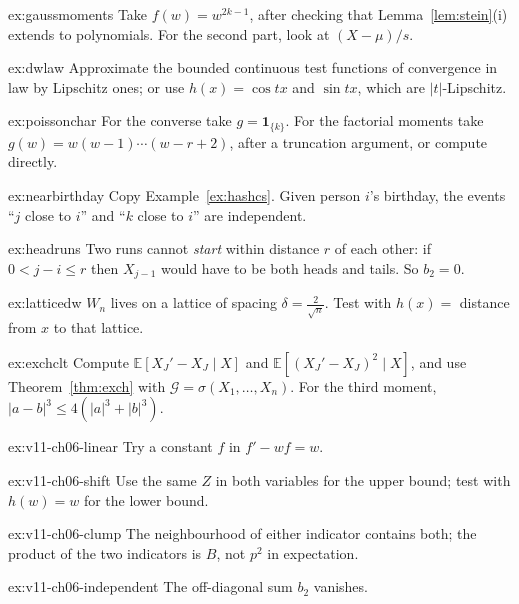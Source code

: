 \begin{hint}{ex:gaussmoments}
Take $f(w)=w^{2k-1}$, after checking that Lemma~\ref{lem:stein}(i) extends to polynomials. For the second part, look at $(X-\mu)/s$.
\end{hint}
\begin{hint}{ex:dwlaw}
Approximate the bounded continuous test functions of convergence in law by Lipschitz ones; or use $h(x)=\cos tx$ and $\sin tx$, which are $|t|$-Lipschitz.
\end{hint}
\begin{hint}{ex:poissonchar}
For the converse take $g=\mathbf 1_{\{k\}}$. For the factorial moments take $g(w)=w(w-1)\cdots(w-r+2)$, after a truncation argument, or compute directly.
\end{hint}
\begin{hint}{ex:nearbirthday}
Copy Example~\ref{ex:hashcs}. Given person $i$'s birthday, the events ``$j$ close to $i$'' and ``$k$ close to $i$'' are independent.
\end{hint}
\begin{hint}{ex:headruns}
Two runs cannot \emph{start} within distance $r$ of each other: if $0<j-i\le r$ then $X_{j-1}$ would have to be both heads and tails. So $b_2=0$.
\end{hint}
\begin{hint}{ex:latticedw}
$W_n$ lives on a lattice of spacing $\delta=\frac2{\sqrt n}$. Test with $h(x)=$ distance from $x$ to that lattice.
\end{hint}
\begin{hint}{ex:exchclt}
Compute $\mathbb E[X_J'-X_J\mid X]$ and $\mathbb E[(X_J'-X_J)^2\mid X]$, and use Theorem~\ref{thm:exch} with $\mathcal G=\sigma(X_1,\dots,X_n)$. For the third moment, $|a-b|^3\le4(|a|^3+|b|^3)$.
\end{hint}

\begin{hint}{ex:v11-ch06-linear}
Try a constant $f$ in $f'-wf=w$.
\end{hint}
\begin{hint}{ex:v11-ch06-shift}
Use the same $Z$ in both variables for the upper bound; test with $h(w)=w$ for the lower bound.
\end{hint}
\begin{hint}{ex:v11-ch06-clump}
The neighbourhood of either indicator contains both; the product of the two indicators is $B$, not $p^2$ in expectation.
\end{hint}
\begin{hint}{ex:v11-ch06-independent}
The off-diagonal sum $b_2$ vanishes.
\end{hint}

